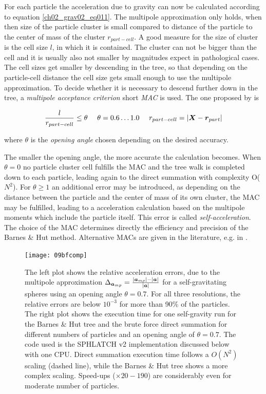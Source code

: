For each particle the acceleration due to gravity can now be calculated according to equation \ref{ch02_grav02_eq011}. The multipole approximation only holds, when then size of the particle cluster is small compared to distance of the particle to the center of mass of the cluster $r_{part- cell}$. A good measure for the size of cluster is the cell size $l$, in which it is contained. The cluster can not be bigger than the cell and it is usually also not smaller by magnitudes expect in pathological cases. The cell sizes get smaller by descending in the tree, so that depending on the particle-cell distance the cell size gets small enough to use the multipole approximation. To decide whether it is necessary to descend further down in the tree, a \emph{multipole acceptance criterion} short \emph{MAC} is used. The one proposed by \cite{1986Natur.324..446B} is

\begin{equation}
\label{ch02_grav02_eq013}
\frac{l}{r_{part-cell}} \le \theta ~~~~ \theta = 0.6 \dots 1.0 ~~~~ r_{part-cell} = | \boldsymbol{X} - \boldsymbol{r}_{part}|
\end{equation}

where $\theta$ is the \emph{opening angle} chosen depending on the desired accuracy. 


The smaller the opening angle, the more accurate the calculation becomes. When $\theta = 0$ no particle cluster cell fulfills the MAC and the tree walk is completed down to each particle, leading again to the direct summation with complexity O($N^2$). For $\theta \ge 1$ an additional error may be introduced, as depending on the distance between the particle and the center of mass of its own cluster, the MAC may be fulfilled, leading to a acceleration calculation based on the multipole moments which include the particle itself. This error is called \emph{self-acceleration}. The choice of the MAC determines directly the efficiency and precision of the Barnes \& Hut method. Alternative MACs are given in the literature, e.g. in \cite{Stadel:2001p48}.

\begin{figure}[htbp]
\begin{center}
\texttt{[image: 09bfcomp]}
\caption{The left plot shows the relative acceleration errors, due to the multipole approximation $\Delta_{\boldsymbol{a}_{mp}} = \frac{|\boldsymbol{a}_{mp}| - |\boldsymbol{a}|}{|\boldsymbol{a}|}$ for a self-gravitating spheres using an opening angle $\theta = 0.7$. For all three resolutions, the relative errors are below $10^{-3}$ for more than 90\% of the particles. 
The right plot shows the execution time for one self-gravity run for the Barnes \& Hut tree and the brute force direct summation for different numbers of particles and an opening angle of $\theta = 0.7$. The code used is the SPHLATCH v2 implementation discussed below with one CPU. Direct summation execution time follows a $O(N^2)$ scaling (dashed line), while the Barnes \& Hut tree shows a more complex scaling. Speed-ups ($\times 20-190$) are considerably even for moderate number of particles.}
\label{ch02_fig09}
\end{center}
\end{figure}


